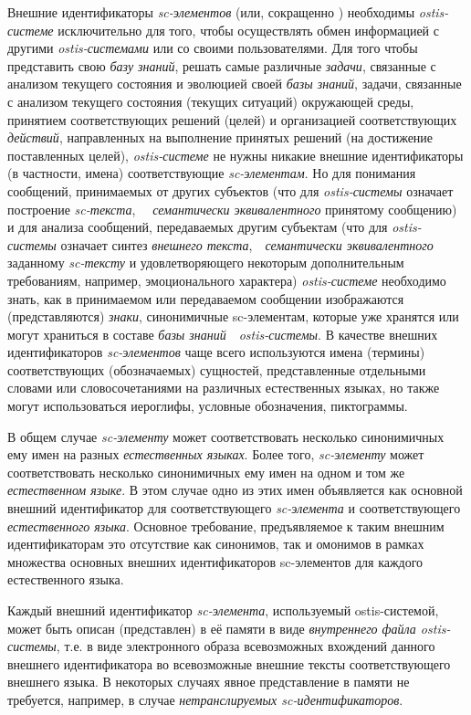 Внешние идентификаторы \textit{sc-элементов} (или, сокращенно ) необходимы \mbox{\textit{ostis-системе}} исключительно для того, чтобы осуществлять обмен информацией с другими \textit{ostis-системами} или со своими пользователями. Для того чтобы представить свою \textit{базу знаний}, решать самые различные \textit{задачи}, связанные с анализом текущего состояния и эволюцией своей \textit{базы знаний}, задачи, связанные с анализом текущего состояния (текущих ситуаций) окружающей среды, принятием соответствующих решений (целей) и организацией соответствующих \textit{действий}, направленных на выполнение принятых решений (на достижение поставленных целей), \textit{ostis-системе} не нужны никакие внешние идентификаторы (в частности, имена) соответствующие \textit{sc-элементам}. Но для понимания сообщений, принимаемых от других субъектов (что для \textit{ostis-системы} означает построение \textit{sc-текста},~~ \textit{семантически эквивалентного} принятому сообщению) и для анализа сообщений, передаваемых другим субъектам (что для \textit{ostis-системы} означает синтез \textit{внешнего текста},~~\textit{семантически эквивалентного} заданному \textit{sc-тексту} и удовлетворяющего некоторым дополнительным требованиям, например, эмоционального характера) \textit{ostis-системе} необходимо знать, как в принимаемом или передаваемом сообщении изображаются (представляются) \textit{знаки}, синонимичные sc-элементам, которые уже хранятся или могут храниться в составе \textit{базы знаний}~~\textit{ostis-системы}. В качестве внешних идентификаторов \textit{sc-элементов} чаще всего используются имена (термины) соответствующих (обозначаемых) сущностей, представленные отдельными словами или словосочетаниями на различных естественных языках, но также могут использоваться иероглифы, условные обозначения, пиктограммы.

В общем случае \textit{sc-элементу} может соответствовать несколько синонимичных ему имен на разных \textit{естественных языках}. Более того, \textit{sc-элементу} может соответствовать несколько синонимичных ему имен на одном и том же \textit{естественном языке}. В этом случае одно из этих имен объявляется как основной внешний идентификатор для соответствующего \textit{sc-элемента} и соответствующего \textit{естественного языка}. Основное требование, предъявляемое к таким внешним идентификаторам это отсутствие как синонимов, так и омонимов в рамках множества основных внешних идентификаторов sc-элементов для каждого естественного языка. 

Каждый внешний идентификатор \textit{sc-элемента}, используемый ostis-системой, может быть описан (представлен) в её памяти в виде \textit{внутреннего файла ostis-системы}, т.е. в виде электронного образа всевозможных вхождений данного внешнего идентификатора во всевозможные внешние тексты соответствующего внешнего языка. В некоторых случаях явное представление в памяти не требуется, например, в случае \textit{нетранслируемых sc-идентификаторов}.

